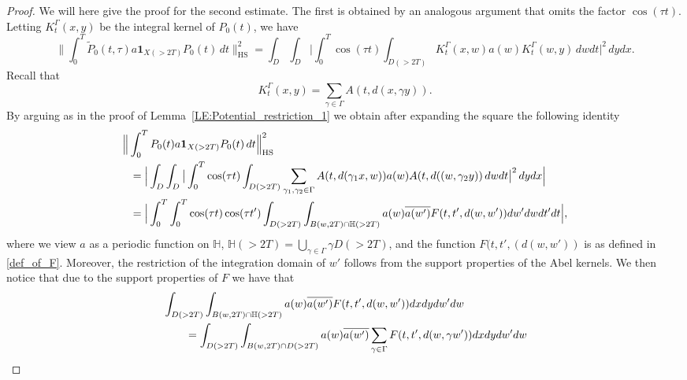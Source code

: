 \documentclass[10pt,a4paper]{amsart}
\newcommand{\bH}{\mathbb{H}}
\newcommand{\bHS}{\mathrm{HS}}
\begin{document}
\begin{proof}
We will here give the proof for the second estimate. The first is obtained by an analogous argument that omits the factor $\cos(\tau t)$. Letting $K_{t}^\Gamma(x,y)$ be the integral kernel of $P_0(t)$, we have
\begin{equation*}
   \Big\lVert \int_0^T  \widetilde{P}_0(t,\tau) a \boldsymbol{1}_{X( > 2T)} P_0(t) \,d t  \Big\rVert_{\bHS}^2 = \int_D \int_D \big|\int_0^T \cos(\tau t) \int_{D( > 2T)} K_t^\Gamma(x,w) a(w) K_{t}^\Gamma(w,y) \, d w d t  \big|^2 \, d yd x.
\end{equation*}
Recall that
\begin{equation*}
        K^\Gamma_{t}(x,y)= \sum_{\gamma \in \Gamma} A(t,d(x,\gamma y)).
\end{equation*}
By arguing as in the proof of Lemma~\ref{LE:Potential_restriction_1} we obtain after expanding the square the following identity
\begin{equation*}
    \begin{aligned}
         \MoveEqLeft \Big\lVert \int_0^T  P_0(t) a \boldsymbol{1}_{X( > 2T)} P_0(t) \,d t  \Big\rVert_{\bHS}^2 
         \\
         ={}&  \Big| \int_D \int_D \big| \int_0^T \cos(\tau t) \int_{D( > 2T)} \sum_{\gamma_1,\gamma_2\in\Gamma} A(t,d(\gamma_1 x,w)) a(w) A(t,d((w, \gamma_2 y)) \, d w  d t \big|^2 \, d yd x \Big|
         \\
         ={}&\Big| \int_0^T\int_0^T \cos(\tau t) \cos(\tau t') \int_{D( > 2T)}  \int_{B(w,2T)\cap \bH( > 2T) }  a(w) \overline{a(w')}  F(t,t',d(w,w'))d w' d w      d t'd t\Big|,
    \end{aligned}
\end{equation*}
where we view $a$ as a periodic function on $\bH$,  $ \bH(>2T) = \bigcup_{\gamma \in \Gamma} \gamma D(>2T) $, and the function $F(t,t',(d(w,w'))$ is as defined in \eqref{def_of_F}. Moreover, the restriction of the integration domain of $w'$ follows from the support properties of the Abel kernels. We then notice that due to the support properties of $F$ we have that 
\begin{equation*}
    \begin{aligned}
         \MoveEqLeft  \int_{D( > 2T)}  \int_{B(w,2T)\cap \bH( > 2T) }  a(w) \overline{a(w')}  F(t,t',d(w,w')) dx dyd w' d w  
         \\
         &=  \int_{D( > 2T)}  \int_{B(w,2T)\cap D( > 2T) }  a(w) \overline{a(w')} \sum_{\gamma \in\Gamma}  F(t,t',d(w, \gamma w')) dx dyd w' d w 
         \\

\end{aligned}
\end{equation*}
\end{proof}
\end{document}
